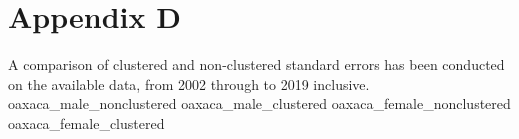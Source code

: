 \documentclass[class=article, crop=false]{standalone}
\begin{document}
\section{Appendix D}
\label{sec:appendixD}
A comparison of clustered and non-clustered standard errors has been conducted on the available data, from 2002 through to 2019 inclusive.
{oaxaca_male_nonclustered}
{oaxaca_male_clustered}
{oaxaca_female_nonclustered}
{oaxaca_female_clustered}

\ifstandalone

\fi
\end{document}
